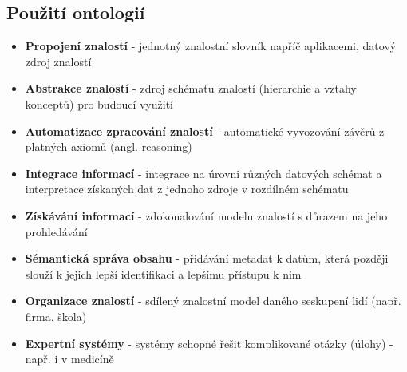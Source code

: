 \subsection{Použití ontologií}
\begin{itemize}
\item \textbf{Propojení znalostí} - jednotný znalostní slovník napříč aplikacemi, datový zdroj znalostí
\item \textbf{Abstrakce znalostí} - zdroj schématu znalostí (hierarchie a vztahy konceptů) pro budoucí využití
\item \textbf{Automatizace zpracování znalostí} - automatické vyvozování závěrů z platných axiomů (angl. reasoning)
\item \textbf{Integrace informací} - integrace na úrovni různých datových schémat a interpretace získaných dat z jednoho zdroje v rozdílném schématu
\item \textbf{Získávání informací} - zdokonalování modelu znalostí s důrazem na jeho prohledávání
\item \textbf{Sémantická správa obsahu} - přidávání metadat k datům, která později slouží k jejich lepší identifikaci a lepšímu přístupu k nim
\item \textbf{Organizace znalostí} - sdílený znalostní model daného seskupení lidí (např. firma, škola)
\item \textbf{Expertní systémy} - systémy schopné řešit komplikované otázky (úlohy) - např. i v medicíně \cite{Stephan2007}
\end{itemize}
